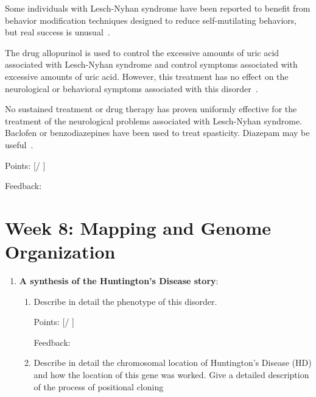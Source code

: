 \documentclass[plain,basic]{inVerba-notes}
\begin{document}
{\begin{enumerate}
\begin{enumerate}
{      Some individuals with Lesch-Nyhan syndrome have been reported to benefit from behavior modification techniques designed to reduce self-mutilating behaviors, but real success is unusual~\cite{nord2}.

      The drug allopurinol is used to control the excessive amounts of uric acid associated with Lesch-Nyhan syndrome and control symptoms associated with excessive amounts of uric acid. However, this treatment has no effect on the neurological or behavioral symptoms associated with this disorder~\cite{nord2}.

      No sustained treatment or drug therapy has proven uniformly effective for the treatment of the neurological problems associated with Lesch-Nyhan syndrome. Baclofen or benzodiazepines have been used to treat spasticity. Diazepam may be useful~\cite{nord2}.
    }

    Points: [\qquad / \qquad ]

    Feedback: 

    \vspace*{50pt}
  \end{enumerate}

\end{enumerate}
  
\newpage
\section{Week 8: Mapping and Genome Organization}

\begin{enumerate}
  \item \textbf{A synthesis of the Huntington’s Disease story}:
  
  \begin{enumerate}
    \item  Describe in detail the phenotype of this disorder.
    
    \basec{
      
    }

    Points: [\qquad / \qquad ]

    Feedback: 

    \vspace*{50pt}
    \item Describe in detail the chromosomal location of Huntington’s Disease (HD) and how the location of this gene was worked. Give a detailed description of the process of positional cloning
    
    \basec{
      
    }


\end{enumerate}
\end{enumerate}}
\end{document}
